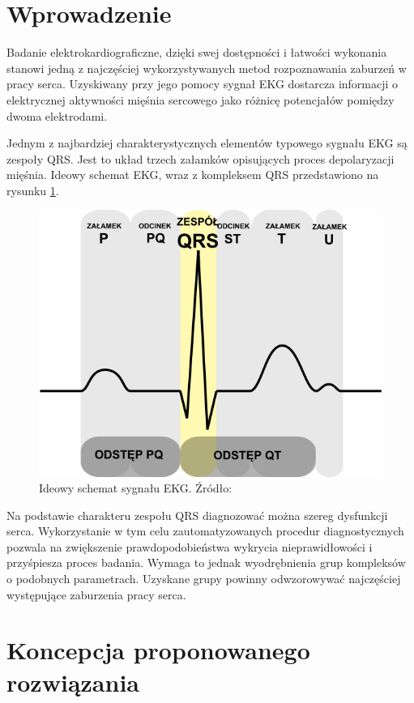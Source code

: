 \section{Wprowadzenie}
Badanie elektrokardiograficzne, dzięki swej dostępności i łatwości wykonania stanowi jedną z najczęściej wykorzystywanych metod rozpoznawania zaburzeń w pracy serca. Uzyskiwany przy jego pomocy sygnał EKG dostarcza informacji o elektrycznej aktywności mięśnia sercowego jako różnicę potencjałów pomiędzy dwoma elektrodami.

Jednym z najbardziej charakterystycznych elementów typowego sygnału EKG są zespoły QRS. Jest to układ trzech załamków opisujących proces depolaryzacji mięśnia. Ideowy schemat EKG, wraz z kompleksem QRS przedstawiono na rysunku \ref{fig:qrs-complex}.


\begin{figure}[H]
	\centering
	\includegraphics[width=12cm]{img/qrs-complex}
	\caption{Ideowy schemat sygnału EKG. Źródło: \cite{qrs-wiki}}
	\label{fig:qrs-complex}
\end{figure}

Na podstawie charakteru zespołu QRS diagnozować można szereg dysfunkcji serca. Wykorzystanie w tym celu zautomatyzowanych procedur diagnostycznych pozwala na zwiększenie prawdopodobieństwa wykrycia nieprawidłowości i przyśpiesza proces badania. Wymaga to jednak wyodrębnienia grup kompleksów o podobnych parametrach. Uzyskane grupy powinny odwzorowywać najczęściej występujące zaburzenia pracy serca.

\section{Koncepcja proponowanego rozwiązania}

